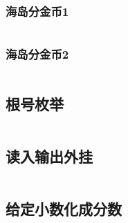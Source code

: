 \documentclass{article}
\begin{document}
\subsubsection{海岛分金币1}
\inputminted[breaklines]{c++}{../其他/海岛分金币1.cpp}

\subsubsection{海岛分金币2}
\inputminted[breaklines]{c++}{../其他/海岛分金币2.cpp}

\subsection{根号枚举}
\inputminted[breaklines]{c++}{../其他/根号枚举.cpp}

\subsection{读入输出外挂}
\inputminted[breaklines]{c++}{../其他/读入输出外挂.cpp}

\subsection{给定小数化成分数}
\inputminted[breaklines]{python}{../其他/给定小数化成分数.py}

\end{document}
